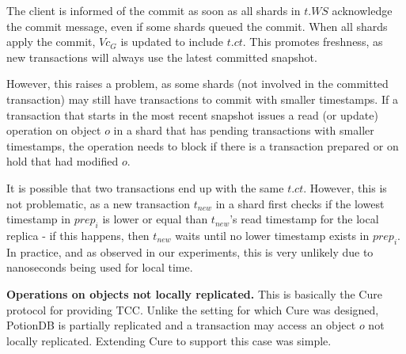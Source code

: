 \documentclass[sigplan,twocolumn,review,anonymous]{acmart}
\begin{document}
The client is informed of the commit as soon as all shards in $t.WS$ acknowledge the commit message, even if 
some shards queued the commit.
When all shards apply the commit, $\mathit{Vc}_G$ is updated to include $t\!.\mathit{ct}$.
This promotes freshness, as new transactions will always use the latest committed snapshot.

However, this raises a problem, as some shards (not involved in the committed transaction) 
may still have transactions to commit with smaller timestamps. 
If a transaction that starts in the most recent snapshot issues a read (or update) operation on object $o$ in a shard that has
pending transactions with smaller timestamps, the operation needs to block if there is a transaction prepared or on hold 
that had modified $o$. 

It is possible that two transactions end up with the same $t\!.\mathit{ct}$.
However, this is not problematic, as a new transaction $\mathit{t}_\mathit{new}$  in a shard first checks if the lowest timestamp in $\mathit{prep}_i$ is lower or equal than $\mathit{t}_\mathit{new}$'s read timestamp for the local replica - if this happens, then $\mathit{t}_\mathit{new}$ waits until no lower timestamp exists in $\mathit{prep}_i$.
In practice, and as observed in our experiments, this is very unlikely due to  nanoseconds being used for local time. %


\noindent
\textbf{Operations on objects not locally replicated.}
This is basically the Cure~\cite{cure} protocol for providing TCC.  
Unlike the setting for which Cure was designed, PotionDB is partially replicated and a transaction 
may access an object $o$
not locally replicated.
Extending Cure to support this case was simple. 
\end{document}
